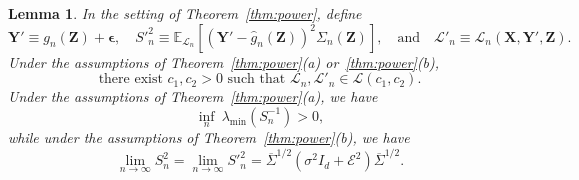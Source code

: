\documentclass[12pt]{article}
\newtheorem{lemma}{Lemma}
\theoremstyle{definition}
\theoremstyle{remark}
\newcommand{\prx}{\bm X}
\newcommand{\prz}{\bm Z}
\newcommand{\pry}{{\bm Y}}
\newcommand{\peps}{\bm \epsilon}
\begin{document}
\begin{lemma} \label{lem:fourth-moment}
	In the setting of Theorem~\ref{thm:power}, define
	\begin{equation}
		\pry' \equiv g_n(\prz) + \peps, \quad S'^2_{n} \equiv \mathbb E_{\mathcal L_n}[(\pry' - \widehat g_n(\prz))^2 \Sigma_n(\prz)], \quad \text{and} \quad \mathcal L'_n \equiv \mathcal L_n(\prx, \pry', \prz).
		\label{prime-definitions}
	\end{equation}
	Under the assumptions of Theorem~\ref{thm:power}(a) or~\ref{thm:power}(b), 
	\begin{equation}
		\text{there exist } c_1, c_2 > 0 \text{ such that } \mathcal L_n, \mathcal L'_n \in \mathscr L(c_1, c_2).
		\label{eighth-moment}
	\end{equation} 
	Under the assumptions of Theorem~\ref{thm:power}(a), we have
	\begin{equation}
	\inf_{n}\ \lambda_{\min}(S_n^{-1}) > 0,
	\label{eq:s-n-2-limit-a}
	\end{equation}
while under the assumptions of Theorem~\ref{thm:power}(b), we have
	\begin{equation}
		\lim_{n \rightarrow \infty} S_n^2 = \lim_{n \rightarrow \infty}  S'^2_n = \overline \Sigma^{1/2}(\sigma^2 I_d + \mathcal E^2)\overline \Sigma^{1/2}.
		\label{eq:s-n-2-limit}
	\end{equation}
	
\end{lemma}
\end{document}
